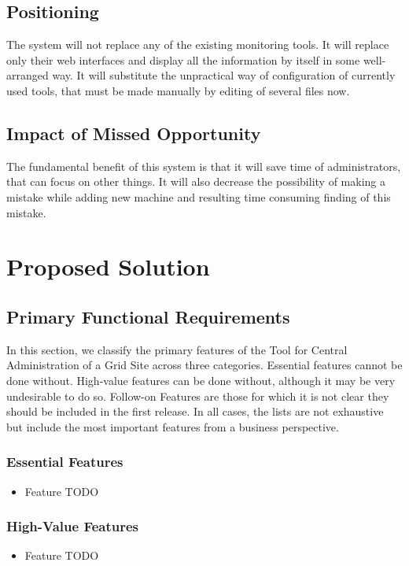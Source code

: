 \documentclass[12pt]{article}
\begin{document}
\subsection{Positioning}
The system will not replace any of the existing monitoring tools. It will replace only their web interfaces and display all the information by itself in some well-arranged way. It will substitute the unpractical way of configuration of currently used tools, that must be made manually by editing of several files now.

\subsection{Impact of Missed Opportunity}
The fundamental benefit of this system is that it will save time of administrators, that can focus on other things. It will also decrease the possibility of making a mistake while adding new machine and resulting time consuming finding of this mistake.


\section{Proposed Solution}

\subsection{Primary Functional Requirements}
In this section, we classify the primary features of the Tool for Central Administration of a Grid Site across three categories. Essential features cannot be done without. High-value features can be done without, although it may be very undesirable to do so. Follow-on Features are those for which it is not clear they should be included in the first release. In all cases, the lists are not exhaustive but include the most important features from a business perspective.

\subsubsection{Essential Features}
\begin{itemize}
\item Feature TODO
\end{itemize}

\subsubsection{High-Value Features}
\begin{itemize}
\item Feature TODO
\end{itemize}
\end{document}
